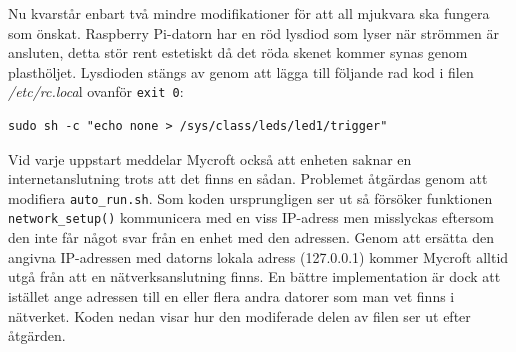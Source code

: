 Nu kvarstår enbart två mindre modifikationer för att all mjukvara ska fungera som önskat. Raspberry Pi-datorn har en röd lysdiod som lyser när strömmen är ansluten, detta stör rent estetiskt då det röda skenet kommer synas genom plasthöljet. Lysdioden stängs av genom att lägga till följande rad kod i filen \textit{/etc/rc.loca}l ovanför {\texttt{exit 0}}:
\begin{verbatim}
sudo sh -c "echo none > /sys/class/leds/led1/trigger"
\end{verbatim}
Vid varje uppstart meddelar Mycroft också att enheten saknar en internetanslutning trots att det finns en sådan. Problemet åtgärdas genom att modifiera {\texttt{auto_run.sh}}. Som koden ursprungligen ser ut så försöker funktionen {\texttt{network_setup()}} kommunicera med en viss IP-adress men misslyckas eftersom den inte får något svar från en enhet med den adressen. Genom att ersätta den angivna IP-adressen med datorns lokala adress (127.0.0.1) kommer Mycroft alltid utgå från att en nätverks\-anslutning finns. En bättre implementation är dock att istället ange adressen till en eller flera andra datorer som man vet finns i nätverket. Koden nedan visar hur den modiferade delen av filen ser ut efter åtgärden.
\inputminted{shell}{auto_run.txt}

